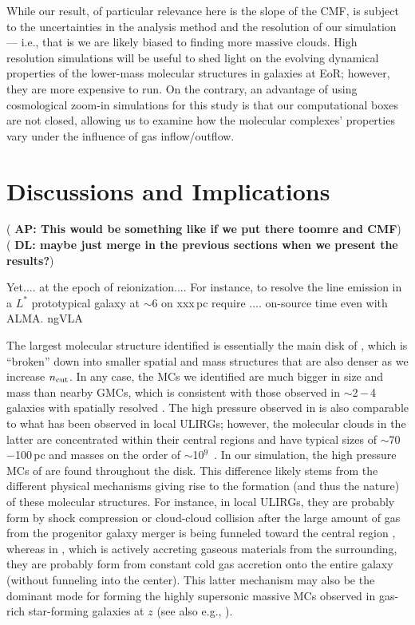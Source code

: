 \documentclass[iop]{emulateapj} %
\newcommand{\AP}[1]{({\bf \color{apcolor} AP: #1})}
\newcommand{\DL}[1]{({\bf \color{dlcolor} DL: #1})}
\begin{document}
While our result, of particular relevance here is the slope of the CMF, is subject
to the uncertainties in the analysis method and the resolution of our simulation --- i.e., that is
we are likely biased to finding more massive clouds.
High resolution simulations will be useful to shed light on
the evolving dynamical properties of the lower-mass molecular structures in
galaxies at EoR; however, they are more expensive to run.
On the contrary, an advantage of using cosmological zoom-in simulations for this study
is that our computational boxes are not closed, allowing us to examine how
the molecular complexes' properties vary under the influence of gas inflow/outflow.




\section{Discussions and Implications}     \label{sec:diss}


\AP{This would be something like \quotes{origin of the cloud and implication of the found properties} if we put there toomre and CMF}
\DL{maybe just merge in the previous sections when we present the results?}

Yet.... at the epoch of reionization.... For instance, to resolve the
\aco line emission in a $L^*$ prototypical galaxy at \z$\sim$6 on xxx\,pc
require .... on-source time even with ALMA.
ngVLA

The largest molecular structure identified is essentially the main disk of \flower, which is ``broken'' down into smaller
spatial and mass structures that are also denser as we increase $n_{\rm cut}$. In any case,
the MCs we identified are much bigger in size and mass than nearby GMCs, which is consistent with
those observed in \z$\sim$2\,$-$\,4 galaxies with spatially resolved \obs.
The high pressure observed in \flower is also comparable to what has been observed in local ULIRGs; however, the 
molecular clouds in the latter are concentrated within their central regions and have typical sizes of $\sim$70$-$100\,pc and masses on the order of $\sim$10$^9$\,\Msun
\citep{Downes98a, Sakamoto08a}. In our simulation, the high pressure MCs of \flower are 
found throughout the disk. This difference likely stems from the different physical mechanisms giving rise 
to the formation (and thus the nature) of these molecular structures. 
For instance, in local ULIRGs, they are probably form by shock compression or cloud-cloud 
collision after the large amount of gas from the progenitor galaxy merger 
is being funneled toward the central region \citep{Tan00a, Wu18a},  %
whereas in \flower, which is actively accreting gaseous materials 
from the surrounding, they are probably form from constant cold gas accretion onto the entire galaxy (without 
funneling into the center).
This latter mechanism may also be the dominant mode for forming the highly supersonic massive MCs observed 
in gas-rich star-forming galaxies at $z$ (see also e.g., \citealt{}).
\end{document}
